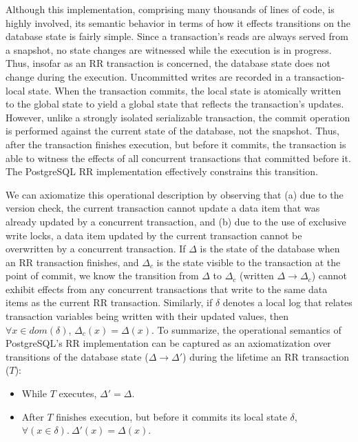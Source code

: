 Although this implementation, comprising many thousands of lines of
code, is highly involved, its semantic behavior in terms of how it
effects transitions on the database state is fairly simple.  Since a
transaction's reads are always served from a snapshot, no state
changes are witnessed while the execution is in progress. Thus,
insofar as an RR transaction is concerned, the database state does not
change during the execution.  Uncommitted writes are recorded in a
transaction-local state.  When the transaction commits, the local
state is atomically written to the global state to yield a global
state that reflects the transaction's updates.  However, unlike a
strongly isolated serializable transaction, the commit operation is
performed against the current state of the database, not the
snapshot. Thus, after the transaction finishes execution, but before
it commits, the transaction is able to witness the effects of all
concurrent transactions that committed before it.  The PostgreSQL RR
implementation effectively constrains this transition.

We can axiomatize this operational description by observing that (a)
due to the version check, the current transaction cannot update a data
item that was already updated by a concurrent transaction, and (b) due
to the use of exclusive write locks, a data item updated by the
current transaction cannot be overwritten by a concurrent transaction.
If $\Delta$ is the state of the database when an RR transaction
finishes, and $\Delta_c$ is the state visible to the transaction at
the point of commit, we know the transition from $\Delta$ to
$\Delta_c$ (written $\Delta \longrightarrow \Delta_c$) cannot exhibit
effects from any concurrent transactions that write to the same data
items as the current RR transaction.  Similarly, if $\delta$ denotes
a local log that relates transaction variables being written with their updated values,
then $\forall x\in\mathit{dom}(\delta)$, $\Delta_c(x) =
\Delta(x)$. To summarize, the operational semantics of PostgreSQL's RR
implementation can be captured as an axiomatization over transitions of
the database state ($\Delta \longrightarrow \Delta'$) during the
lifetime an RR transaction ($T$):
\begin{itemize}
  \item While $T$ executes, $\Delta' = \Delta$.
  \item After $T$ finishes execution, but before it commits its local
    state $\delta$, $\forall(x\in\delta).~\Delta'(x) = \Delta(x)$.
\end{itemize}

